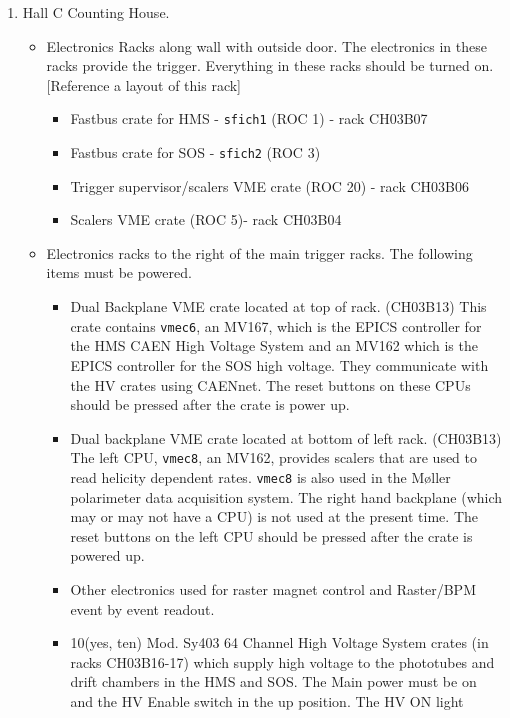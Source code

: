 \begin{enumerate}
\begin{itemize}
\end{itemize}


\item Hall C Counting House.
\begin{itemize}
\item Electronics Racks along wall with outside door.  The electronics in
these racks provide the trigger.  Everything in these racks should be
turned on.  [Reference a layout of this rack]
\begin{itemize}
\item Fastbus crate for HMS - \verb|sfich1| (ROC 1) - rack CH03B07
\item Fastbus crate for SOS - \verb|sfich2| (ROC 3)
\item Trigger supervisor/scalers VME crate (ROC 20) - rack CH03B06
\item Scalers VME crate (ROC 5)- rack CH03B04
\end{itemize}
\item Electronics racks to the right of the main trigger racks.  The
following items must be powered.
\begin{itemize}
\item Dual Backplane VME crate located at top of rack. (CH03B13)
This crate contains \verb|vmec6|, an
MV167, which is the EPICS controller for the HMS CAEN High Voltage System
and an MV162 which is the EPICS controller for the SOS high voltage.  They
communicate with the HV crates using CAENnet.  The reset buttons on these
CPUs should be pressed after the crate is power up.
\item Dual backplane VME crate located at bottom of left rack.  (CH03B13)
The left CPU, \verb|vmec8|, an MV162,
provides scalers that are used to read helicity dependent rates.  \verb|vmec8|
is also used in the M\o ller polarimeter data acquisition system.
The right hand backplane (which may or may not have a CPU) is not used at
the present time.
The reset buttons on the left CPU 
should be pressed after the crate is powered up.
\item Other electronics used for raster magnet control and Raster/BPM
event by event readout.
\item 10(yes, ten) Mod. Sy403 64 Channel High Voltage System crates
(in racks CH03B16-17) which supply high
voltage to the phototubes and drift chambers in the HMS and SOS.
The Main power
must be on and the HV Enable switch in the up position.  The HV ON light

\end{itemize}
\end{itemize}
\end{enumerate}
